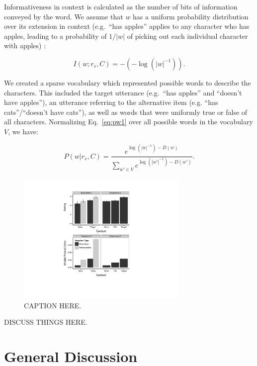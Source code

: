 \documentclass[10pt,letterpaper]{article}
\begin{document}
\noindent Informativeness in context is calculated as the number of bits of information conveyed by the word. We assume that $w$ has a uniform probability distribution over its extension in context (e.g.\ ``has apples'' applies to any character who has apples, leading to a probability of $1/|w|$ of picking out each individual character with apples) :

\begin{equation}\label{eq:info}
I(w;r_s, C) = -(-\log(|w|^{-1})).
\end{equation}

We created a sparse vocabulary which represented possible words to describe the characters.  This included the target utterance (e.g.\ ``has apples'' and ``doesn't have apples''), an utterance referring to the alternative item (e.g. ``has cats''/``doesn't have cats''), as well as words that were uniformly true or false of all characters. Normalizing Eq.\ \ref{eq:pw1} over all possible words in the vocabulary $V$, we have:

\begin{equation}\label{eq:pw2}
P(w | r_s, C) = \frac{ e^{\log(|w|^{-1}) - D(w)}} {\sum_{w' \in V}{e^{\log(|w'|^{-1}) - D(w')}}}.
\end{equation}

\begin{figure}
\begin{center} 
\includegraphics[width=3.25in]{figures/modelcomp.pdf}
\caption{\label{fig:modelvdata} CAPTION HERE.}
\end{center} 
\end{figure}

DISCUSS THINGS HERE.

\section{General Discussion}



\setlength{\bibleftmargin}{.125in}
\setlength{\bibindent}{-\bibleftmargin}


\end{document}

